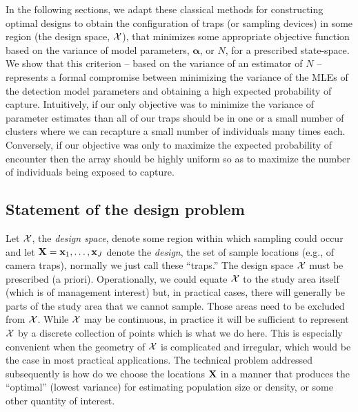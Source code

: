 In the following sections, we adapt these classical methods for
constructing optimal designs to obtain the configuration of traps (or
sampling devices) in some region (the design space, ${\cal X}$),
that
minimizes some appropriate objective function based on 
the variance of model parameters,
${\bm \alpha}$, or $N$, for a prescribed
state-space. 
We show that this criterion -- based on the variance of
an estimator of $N$ -- represents a formal compromise between
minimizing the variance of the MLEs of the detection model parameters
and obtaining a high expected probability of capture.
Intuitively, if our only objective was to minimize the variance of
parameter estimates than all of our traps should be in one or a small
number of clusters where we can recapture a small number of
individuals many times each. Conversely, if our objective was only to
maximize the expected probability of encounter then the array should
be highly uniform so as to maximize the number of individuals being
exposed to capture.  



\subsection{Statement of the design problem}

Let ${\cal X}$, the {\it design space}, denote some region within
which sampling could occur and let ${\bf X} = {\bf x}_{1},\ldots, {\bf
  x}_{J}$ denote the {\it design}, the set of sample locations (e.g.,
of camera traps), normally we just call these ``traps.''  The design
space ${\cal X}$ must be prescribed (a priori).  Operationally, we
could equate ${\cal X}$ to the study area itself (which is of
management interest) but, in practical cases, there will generally be parts of
the study area that we cannot sample. Those areas need to be excluded
from ${\cal X}$.  While ${\cal X}$ may be continuous, in practice it
will be sufficient to represent ${\cal X}$ by a discrete collection of
points which is what we do here.  
This is especially convenient when
the geometry of ${\cal X}$ is complicated and irregular, which would
be the case in most practical applications.  The technical problem
addressed subsequently is how do we choose the locations ${\bf X}$ in
a manner that produces the ``optimal'' (lowest variance) for
estimating population size or density, or some other quantity of
interest. 

